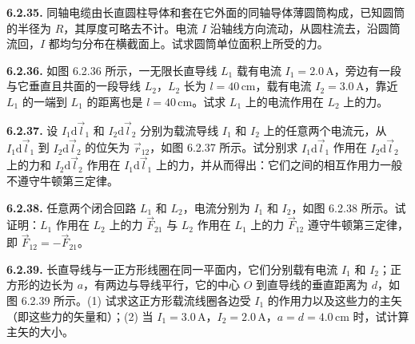 \textbf{6.2.35.} 同轴电缆由长直圆柱导体和套在它外面的同轴导体薄圆筒构成，已知圆筒的半径为 $R$，其厚度可略去不计。电流 $I$ 沿轴线方向流动，从圆柱流去，沿圆筒流回，$I$ 都均匀分布在横截面上。试求圆筒单位面积上所受的力。

\begin{center}
\end{center}

\vfill
\newpage

\textbf{6.2.36.} 如图 6.2.36 所示，一无限长直导线 $L_{1}$ 载有电流 $I_{1} = 2.0\,\mathrm{A}$，旁边有一段与它垂直且共面的一段导线 $L_{2}$，$L_{2}$ 长为 $l = 40\,\mathrm{cm}$，载有电流 $I_{2} = 3.0\,\mathrm{A}$，靠近 $L_{1}$ 的一端到 $L_{1}$ 的距离也是 $l = 40\,\mathrm{cm}$。试求 $L_{1}$ 上的电流作用在 $L_{2}$ 上的力。

\begin{center}
\end{center}

\vfill
\newpage

\textbf{6.2.37.} 设 $I_{1}\mathrm{d}\vec{l}_{1}$ 和 $I_{2}\mathrm{d}\vec{l}_{2}$ 分别为载流导线 $I_{1}$ 和 $I_{2}$ 上的任意两个电流元，从 $I_{1}\mathrm{d}\vec{l}_{1}$ 到 $I_{2}\mathrm{d}\vec{l}_{2}$ 的位矢为 $\vec{r}_{12}$，如图 6.2.37 所示。试分别求 $I_{1}\mathrm{d}\vec{l}_{1}$ 作用在 $I_{2}\mathrm{d}\vec{l}_{2}$ 上的力和 $I_{2}\mathrm{d}\vec{l}_{2}$ 作用在 $I_{1}\mathrm{d}\vec{l}_{1}$ 上的力，并从而得出：它们之间的相互作用力一般不遵守牛顿第三定律。

\begin{center}
\end{center}

\vfill
\newpage

\textbf{6.2.38.} 任意两个闭合回路 $L_{1}$ 和 $L_{2}$，电流分别为 $I_{1}$ 和 $I_{2}$，如图 6.2.38 所示。试证明：$L_{1}$ 作用在 $L_{2}$ 上的力 $\vec{F}_{21}$ 与 $L_{2}$ 作用在 $L_{1}$ 上的力 $\vec{F}_{12}$ 遵守牛顿第三定律，即 $\vec{F}_{12} = -\vec{F}_{21}$。

\begin{center}
\end{center}

\vfill
\newpage

\textbf{6.2.39.} 长直导线与一正方形线圈在同一平面内，它们分别载有电流 $I_{1}$ 和 $I_{2}$；正方形的边长为 $a$，有两边与导线平行，它的中心 $O$ 到直导线的垂直距离为 $d$，如图 6.2.39 所示。(1) 试求这正方形载流线圈各边受 $I_{1}$ 的作用力以及这些力的主矢（即这些力的矢量和）；(2) 当 $I_{1} = 3.0\,\mathrm{A}$，$I_{2} = 2.0\,\mathrm{A}$，$a = d = 4.0\,\mathrm{cm}$ 时，试计算主矢的大小。

